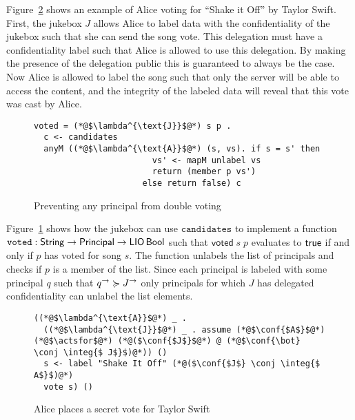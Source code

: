 Figure~\ref{fig:jukebox-alice-votes-for-taylor-swift} shows an example of Alice voting for ``Shake it Off'' by Taylor Swift. First, the jukebox $J$ allows Alice to label data with the confidentiality of the jukebox such that she can send the song vote. This delegation must have a confidentiality label such that Alice is allowed to use this delegation. By making the presence of the delegation public this is guaranteed to always be the case. Now Alice is allowed to label the song such that only the server will be able to access the content, and the integrity of the labeled data will reveal that this vote was cast by Alice.

\begin{figure}
\centering
\begin{lstlisting}
voted = (*@$\lambda^{\text{J}}$@*) s p .
  c <- candidates
  anyM ((*@$\lambda^{\text{A}}$@*) (s, vs). if s = s' then
                        vs' <- mapM unlabel vs
                        return (member p vs')
                      else return false) c
\end{lstlisting}
\caption{Preventing any principal from double voting}
\label{fig:prevent-double-voting}
\end{figure}

Figure~\ref{fig:prevent-double-voting} shows how the jukebox can use $\mathtt{candidates}$ to implement a function $\mathtt{voted}: \mathsf{String} \rightarrow \mathsf{Principal} \rightarrow \mathsf{LIO}\,\mathsf{Bool}$ such that $\mathsf{voted}\; s\; p$ evaluates to $\mathsf{true}$ if and only if $p$ has voted for song $s$. The function unlabels the list of principals and checks if $p$ is a member of the list. Since each principal is labeled with some principal $q$ such that $q^{\rightarrow} \succcurlyeq J^{\rightarrow}$ only principals for which $J$ has delegated confidentiality can unlabel the list elements.

\begin{figure}
\centering
\begin{lstlisting}
((*@$\lambda^{\text{A}}$@*) _ .
  ((*@$\lambda^{\text{J}}$@*) _ . assume (*@$\conf{$A$}$@*) (*@$\actsfor$@*) (*@($\conf{$J$}$@*) @ (*@$\conf{\bot} \conj \integ{$ J$}$)@*)) ()
  s <- label "Shake It Off" (*@($\conf{$J$} \conj \integ{$ A$}$)@*)
  vote s) ()
\end{lstlisting}
\caption{Alice places a secret vote for Taylor Swift}
\label{fig:jukebox-alice-votes-for-taylor-swift}
\end{figure}


